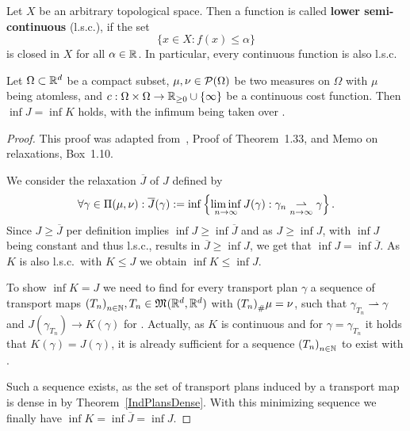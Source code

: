 \begin{definition}\label{lsc}
	Let $X$ be an arbitrary topological space. Then a function  is called \textbf{lower semi-continuous} (l.s.c.), if the set
	\[ \{ x \in X : f(x) \le \alpha \} \]
	is closed in $X$ for all $\alpha \in \R$. In particular, every continuous function  is also l.s.c.
\end{definition}

\begin{theorem}\label{InfCoincide}
	Let $\Omega \subset \R^d$ be a compact subset, $\mu, \nu \in \PM{\Omega}$ be two measures on $\Omega$ with $\mu$ being atomless, and $\map[c]{\Omega \times \Omega}{\RZero \cup \{ \infty \}}$ be a continuous cost function. Then $\inf J = \inf K$ holds, with the infimum being taken over \TP{\mu}{\nu}.
\end{theorem}

\begin{proof}
	This proof was adapted from~\cite{San2015}, Proof of Theorem~1.33, and Memo on relaxations, Box~1.10.

	We consider the relaxation $\overline{J}$ of $J$ defined by
	\[ \forall \gamma \in \TP{\mu}{\nu}: \overline{J}(\gamma) := \inf \left\{ \liminf\limits_{\Ninf} J(\gamma) : \weak{\gamma_n}{\gamma} \right\}. \]
	Since $J \ge \overline{J}$ per definition implies $\inf J \ge \inf \overline{J}$ and as $J \ge \inf J$, with $\inf J$ being constant and thus l.s.c., results in $\overline{J} \ge \inf J$, we get that $\inf J = \inf \overline{J}$. As $K$ is also l.s.c.\ with $K \le J$ we obtain $\inf K \le \inf J$.

	To show $\inf K = J$ we need to find for every transport plan $\gamma$ a sequence of transport maps ${(T_n)}_{\NinN}, T_n \in \MF{\R^d}{\R^d}$ with $\push[(T_n)]{\mu} = \nu$, such that $\gamma_{T_n} \rightharpoonup \gamma$ and $J(\gamma_{T_n}) \rightarrow K(\gamma)$ for \Ninf. Actually, as $K$ is continuous and for $\gamma = \gamma_{T_n}$ it holds that $K(\gamma) = J(\gamma)$, it is already sufficient for a sequence ${(T_n)}_{\NinN}$ to exist with .

	Such a sequence exists, as the set of transport plans induced by a transport map is dense in \TP{\mu}{\nu} by Theorem~\ref{IndPlansDense}. With this minimizing sequence we finally have $\inf K = \inf \overline{J} = \inf J$.
\end{proof}

